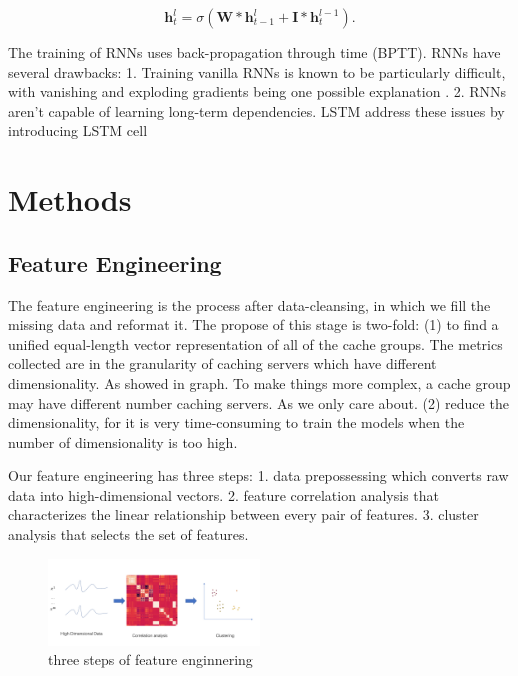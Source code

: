 \documentclass[5p]{elsarticle}
\begin{document}
\begin{equation}
	\mathbf h_t^{l} = \sigma(\mathbf W * \mathbf h_{t-1}^{l} + \mathbf I * \mathbf h_t^{l-1}).
\end{equation}

The training of RNNs uses back-propagation through time (BPTT). RNNs have several drawbacks: 1. Training vanilla RNNs is known to be particularly difficult, with vanishing and exploding gradients being one possible explanation \cite{Bengio1994LearningDifficult}. 2. RNNs aren't capable of learning long-term dependencies. LSTM address these issues by introducing LSTM cell\cite{Hochreiter1997LongMemory} 


\section{Methods}
\subsection{Feature Engineering}
The feature engineering is the process after data-cleansing, in which we fill the missing data and reformat it. The propose of this stage is two-fold:
(1) to find a unified equal-length vector representation of all of the cache groups. 
The metrics collected are in the granularity of caching servers which have different dimensionality. As showed in graph. To make things more complex, a cache group may have different number caching servers. As we only care about. 
(2) reduce the dimensionality, for it is very time-consuming to train the models when the number of dimensionality is too high.

Our feature engineering has three steps: 1. data prepossessing which converts raw data into high-dimensional vectors. 2. feature correlation analysis that characterizes the linear relationship between every pair of features. 3. cluster analysis that selects the set of features.

\begin{figure}[h]
    \centering
    \includegraphics[width=0.5\textwidth]{feature_engineering.png}
    \caption{three steps of feature enginnering}
    \label{fig:Correlation_matrix}
\end{figure}
\end{document}
